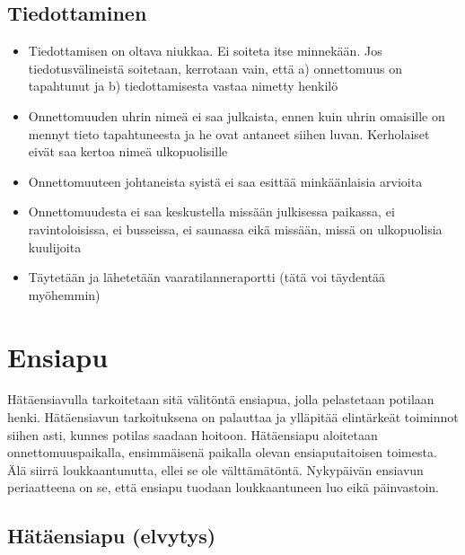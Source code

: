 \subsection{Tiedottaminen}
\label{riskitekijat-toiminta-onnettomuustilanteessa-ja-ensiapu-tiedottaminen}

\begin{itemize}
\item  Tiedottamisen on oltava niukkaa. Ei soiteta itse minnekään. Jos tiedotusvälineistä soitetaan, kerrotaan vain, että a) onnettomuus on tapahtunut ja b) tiedottamisesta vastaa nimetty henkilö 
\item  Onnettomuuden uhrin nimeä ei saa julkaista, ennen kuin uhrin omaisille on mennyt tieto tapahtuneesta ja he ovat antaneet siihen luvan. Kerholaiset eivät saa kertoa nimeä ulkopuolisille 
\item  Onnettomuuteen johtaneista syistä ei saa esittää minkäänlaisia arvioita 
\item  Onnettomuudesta ei saa keskustella missään julkisessa paikassa, ei ravintoloisissa, ei busseissa, ei saunassa eikä missään, missä on ulkopuolisia kuulijoita 
\item  Täytetään ja lähetetään vaaratilanneraportti (tätä voi täydentää myöhemmin) 
\end{itemize}
\section{ Ensiapu }
\label{riskitekijat-toiminta-onnettomuustilanteessa-ja-ensiapu-ensiapu}


Hätäensiavulla tarkoitetaan sitä välitöntä ensiapua, jolla pelastetaan potilaan henki. Hätäensiavun tarkoituksena on palauttaa ja ylläpitää elintärkeät toiminnot siihen asti, kunnes potilas saadaan hoitoon. Hätäensiapu aloitetaan onnettomuuspaikalla, ensimmäisenä paikalla olevan ensiaputaitoisen toimesta. Älä siirrä loukkaantunutta, ellei se ole välttämätöntä. Nykypäivän ensiavun periaatteena on se, että ensiapu tuodaan loukkaantuneen luo eikä päinvastoin. 

\subsection{ Hätäensiapu (elvytys) }
\label{riskitekijat-toiminta-onnettomuustilanteessa-ja-ensiapu-hataensiapu-elvytys}

